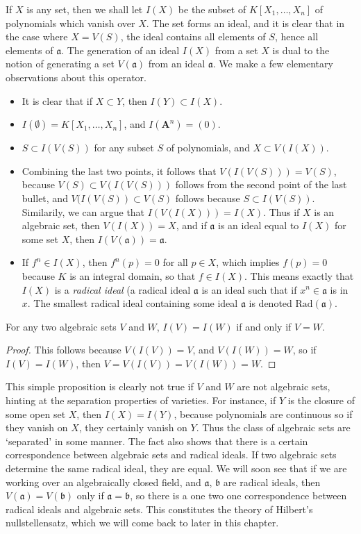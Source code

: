 If $X$ is any set, then we shall let $I(X)$ be the subset of $K[X_1, \dots, X_n]$ of polynomials which vanish over $X$. The set forms an ideal, and it is clear that in the case where $X = V(S)$, the ideal contains all elements of $S$, hence all elements of $\mathfrak{a}$. The generation of an ideal $I(X)$ from a set $X$ is dual to the notion of generating a set $V(\mathfrak{a})$ from an ideal $\mathfrak{a}$. We make a few elementary observations about this operator.
%
\begin{itemize}
    \item It is clear that if $X \subset Y$, then $I(Y) \subset I(X)$.
    \item $I(\emptyset) = K[X_1, \dots, X_n]$, and $I(\mathbf{A}^n) = (0)$.
    \item $S \subset I(V(S))$ for any subset $S$ of polynomials, and $X \subset V(I(X))$.
    \item Combining the last two points, it follows that $V(I(V(S))) = V(S)$, because $V(S) \subset V(I(V(S)))$ follows from the second point of the last bullet, and $V(I(V(S)) \subset V(S)$ follows because $S \subset I(V(S))$. Similarily, we can argue that $I(V(I(X))) = I(X)$. Thus if $X$ is an algebraic set, then $V(I(X)) = X$, and if $\mathfrak{a}$ is an ideal equal to $I(X)$ for some set $X$, then $I(V(\mathfrak{a})) = \mathfrak{a}$.
    \item If $f^n \in I(X)$, then $f^n(p) = 0$ for all $p \in X$, which implies $f(p) = 0$ because $K$ is an integral domain, so that $f \in I(X)$. This means exactly that $I(X)$ is a {\it radical ideal} (a radical ideal $\mathfrak{a}$ is an ideal such that if $x^n \in \mathfrak{a}$ is in $x$. The smallest radical ideal containing some ideal $\mathfrak{a}$ is denoted $\text{Rad}(\mathfrak{a})$.
\end{itemize}

\begin{prop}
    For any two algebraic sets $V$ and $W$, $I(V) = I(W)$ if and only if $V = W$.
\end{prop}
\begin{proof}
    This follows because $V(I(V)) = V$, and $V(I(W)) = W$, so if $I(V) = I(W)$, then $V = V(I(V)) = V(I(W)) = W$.
\end{proof}

This simple proposition is clearly not true if $V$ and $W$ are not algebraic sets, hinting at the separation properties of varieties. For instance, if $Y$ is the closure of some open set $X$, then $I(X) = I(Y)$, because polynomials are continuous so if they vanish on $X$, they certainly vanish on $Y$. Thus the class of algebraic sets are `separated' in some manner. The fact also shows that there is a certain correspondence between algebraic sets and radical ideals. If two algebraic sets determine the same radical ideal, they are equal. We will soon see that if we are working over an algebraically closed field, and $\mathfrak{a}$, $\mathfrak{b}$ are radical ideals, then $V(\mathfrak{a}) = V(\mathfrak{b})$ only if $\mathfrak{a} = \mathfrak{b}$, so there is a one two one correspondence between radical ideals and algebraic sets. This constitutes the theory of Hilbert's nullstellensatz, which we will come back to later in this chapter.

